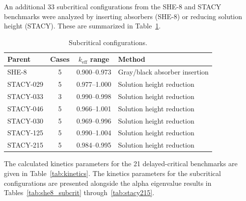 \documentclass[12pt,preprint]{elsarticle}
\begin{document}
An additional 33 subcritical configurations from the SHE-8 and STACY benchmarks were analyzed by inserting absorbers (SHE-8) or reducing solution height (STACY). These are summarized in Table~\ref{tab:subcrit_benchmarks}.

\begin{table}[H]
\centering
\caption{Subcritical configurations.}
\label{tab:subcrit_benchmarks}
\footnotesize
\begin{tabular}{@{}lccl@{}}
\toprule
Parent & Cases & $k_{\mathrm{eff}}$ range & Method \\
\midrule
SHE-8    & 5  & 0.900--0.973 & Gray/black absorber insertion \\
STACY-029 & 5 & 0.977--1.000 & Solution height reduction \\
STACY-033 & 3 & 0.990--0.998 & Solution height reduction \\
STACY-046 & 5 & 0.966--1.001 & Solution height reduction \\
STACY-030 & 5 & 0.969--0.996 & Solution height reduction \\
STACY-125 & 5 & 0.990--1.004 & Solution height reduction \\
STACY-215 & 5 & 0.984--0.995 & Solution height reduction \\
\bottomrule
\end{tabular}
\end{table}

The calculated kinetics parameters for the 21 delayed-critical benchmarks are given in Table~\ref{tab:kinetics}. The kinetics parameters for the subcritical configurations are presented alongside the alpha eigenvalue results in Tables~\ref{tab:she8_subcrit} through~\ref{tab:stacy215}.
\end{document}
